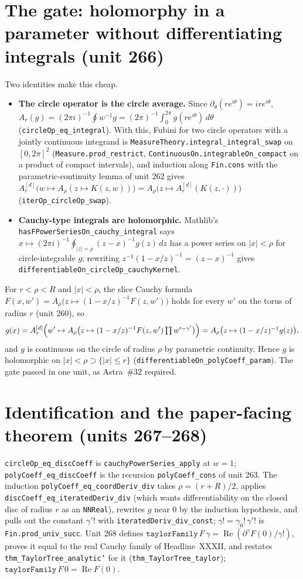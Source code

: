\documentclass[11pt]{article}
\begin{document}
\section{The gate: holomorphy in a parameter without differentiating integrals (unit 266)}
Two identities make this cheap.
\begin{itemize}
\item \textbf{The circle operator is the circle average.} Since $\partial_\theta(re^{i\theta})=ire^{i\theta}$,
$A_r(g)=(2\pi i)^{-1}\oint w^{-1}g=(2\pi)^{-1}\int_0^{2\pi}g(re^{i\theta})\,d\theta$
(\texttt{circleOp\_eq\_integral}). With this, Fubini for two circle operators with a jointly continuous
integrand is \texttt{MeasureTheory.integral\_integral\_swap} on $[0,2\pi]^2$
(\texttt{Measure.prod\_restrict}, \texttt{ContinuousOn.integrableOn\_compact} on a product of compact
intervals), and induction along \texttt{Fin.cons} with the parametric-continuity lemma of unit 262 gives
$A_r^{[d]}\bigl(w\mapsto A_\rho(z\mapsto K(z,w))\bigr)=A_\rho\bigl(z\mapsto A_r^{[d]}(K(z,\cdot))\bigr)$
(\texttt{iterOp\_circleOp\_swap}).
\item \textbf{Cauchy-type integrals are holomorphic.} Mathlib's
\texttt{hasFPowerSeriesOn\_cauchy\_integral} says $x\mapsto(2\pi i)^{-1}\oint_{|z|=\rho}(z-x)^{-1}g(z)\,dz$
has a power series on $|x|<\rho$ for circle-integrable $g$; rewriting $z^{-1}(1-x/z)^{-1}=(z-x)^{-1}$
gives \texttt{differentiableOn\_circleOp\_cauchyKernel}.
\end{itemize}
For $r<\rho<R$ and $|x|<\rho$, the slice Cauchy formula $F(x,w')=A_\rho\bigl(z\mapsto(1-x/z)^{-1}F(z,w')\bigr)$
holds for every $w'$ on the torus of radius $r$ (unit 260), so
\[
g(x)=A_r^{[d]}\Bigl(w'\mapsto A_\rho\bigl(z\mapsto(1-x/z)^{-1}F(z,w')\textstyle\prod w'^{-\gamma'}\bigr)\Bigr)
=A_\rho\bigl(z\mapsto(1-x/z)^{-1}g(z)\bigr),
\]
and $g$ is continuous on the circle of radius $\rho$ by parametric continuity. Hence $g$ is holomorphic
on $|x|<\rho\supset\{|x|\le r\}$ (\texttt{differentiableOn\_polyCoeff\_param}). The gate passed in one
unit, as Astra~\#32 required.

\section{Identification and the paper-facing theorem (units 267--268)}
\texttt{circleOp\_eq\_discCoeff} is \texttt{cauchyPowerSeries\_apply} at $w=1$;
\texttt{polyCoeff\_eq\_discCoeff} is the recursion \texttt{polyCoeff\_cons} of unit 263. The induction
\texttt{polyCoeff\_eq\_coordDeriv\_div} takes $\rho=(r+R)/2$, applies
\texttt{discCoeff\_eq\_iteratedDeriv\_div} (which wants differentiability on the closed disc of radius
$r$ as an \texttt{NNReal}), rewrites $g$ near $0$ by the induction hypothesis, and pulls out the constant
$\gamma'!$ with \texttt{iteratedDeriv\_div\_const}; $\gamma!=\gamma_0!\,\gamma'!$ is
\texttt{Fin.prod\_univ\_succ}. Unit 268 defines
$\texttt{taylorFamily}\,F\,\gamma=\operatorname{Re}(\partial^\gamma F(0)/\gamma!)$, proves it equal to the
real Cauchy family of Headline~XXXII, and restates \texttt{thm\_TaylorTree\_analytic'} for it
(\texttt{thm\_TaylorTree\_taylor}); $\texttt{taylorFamily}\,F\,0=\operatorname{Re}F(0)$.
\end{document}
